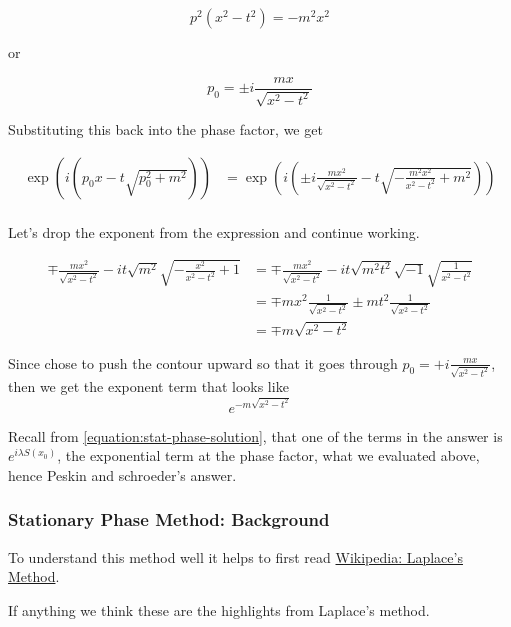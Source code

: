 $$
p^2 \left(x^2 - t^2 \right) = -m^2 x^2
$$

or

$$
p_0 = \pm i \frac{mx}{ \sqrt{ x^2 - t^2 } }
$$


Substituting this back into the phase factor, we get

\begin{align*}
\exp\left( i \left(p_0 x - t\sqrt{p_{0}^{2} + m^2}\right) \right) &=
    \exp\left( i \left(\pm i \frac{mx^2}{ \sqrt{ x^2 - t^2 } } 
        - t\sqrt{-\frac{m^2 x^2}{x^2 - t^2} + m^2}\right) \right) \\
\end{align*}

Let's drop the exponent from the expression and continue working.

\begin{align*}
\mp \frac{mx^2}{ \sqrt{ x^2 - t^2 } }
    - i t \sqrt{m^2} \sqrt{-\frac{x^2}{x^2 - t^2} + 1}
&= \mp \frac{mx^2}{ \sqrt{ x^2 - t^2 } }
    - i t \sqrt{m^2 t^2} \sqrt{-1} \sqrt{ \frac{1}{x^2 - t^2} } \\
&= \mp m x^2 \frac{1}{ \sqrt{ x^2 - t^2 } }
    \pm m t^2 \frac{1}{ \sqrt{ x^2 - t^2 } } \\
&= \mp m \sqrt{x^2 - t^2}
\end{align*}


Since \cite{peskin-and-schroeder} chose to push the contour upward so that it goes through
$p_0 = + i \frac{mx}{ \sqrt{ x^2 - t^2 } } $, then we get the exponent term that looks like
$$
e^{- m \sqrt{x^2 - t^2}}
$$


Recall from \ref{equation:stat-phase-solution}, that one of the terms in the answer is
$e^{ i\lambda S(x_0) }$, the exponential term at the phase factor, what we evaluated above,
hence Peskin and schroeder's answer.








\subsubsection{Stationary Phase Method: Background}

To understand this method well it helps to first read
\href{https://en.wikipedia.org/wiki/Laplace%27s_method}{Wikipedia: Laplace's Method}.

If anything we think these are the highlights from Laplace's method.

